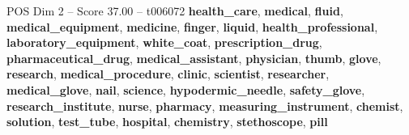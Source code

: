 \begin{textsample}{POS Dim 2 – Score 37.00 – t006072}  \label{ex:f2_pos_001}
\textbf{health\_care}, \textbf{medical}, \textbf{fluid}, \textbf{medical\_equipment}, \textbf{medicine}, \textbf{finger}, \textbf{liquid}, \textbf{health\_professional}, \textbf{laboratory\_equipment}, \textbf{white\_coat}, \textbf{prescription\_drug}, \textbf{pharmaceutical\_drug}, \textbf{medical\_assistant}, \textbf{physician}, \textbf{thumb}, \textbf{glove}, \textbf{research}, \textbf{medical\_procedure}, \textbf{clinic}, \textbf{scientist}, \textbf{researcher}, \textbf{medical\_glove}, \textbf{nail}, \textbf{science}, \textbf{hypodermic\_needle}, \textbf{safety\_glove}, \textbf{research\_institute}, \textbf{nurse}, \textbf{pharmacy}, \textbf{measuring\_instrument}, \textbf{chemist}, \textbf{solution}, \textbf{test\_tube}, \textbf{hospital}, \textbf{chemistry}, \textbf{stethoscope}, \textbf{pill}

\end{textsample}
